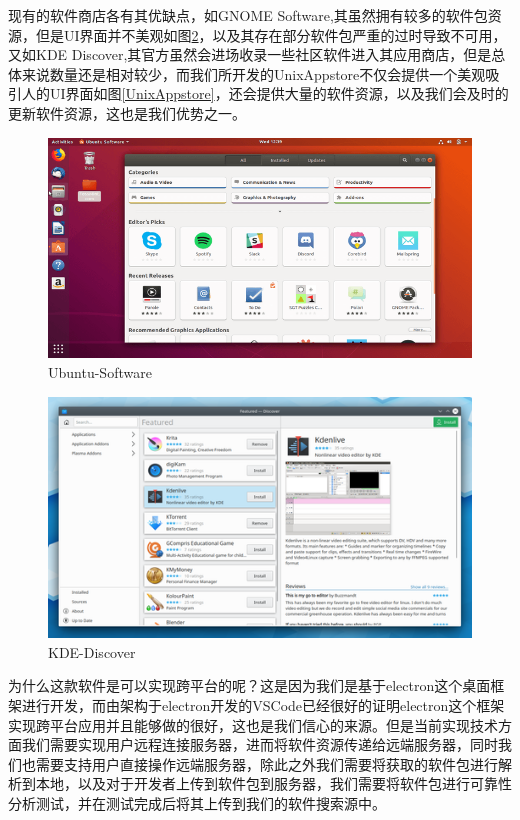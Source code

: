 \documentclass[lang=cn,a4paper]{elegantpaper}
\begin{document}
现有的软件商店各有其优缺点，如GNOME Software,其虽然拥有较多的软件包资源，但是UI界面并不美观如图\ref{KDEDiscover}，以及其存在部分软件包严重的过时导致不可用，又如KDE Discover,其官方虽然会进场收录一些社区软件进入其应用商店，但是总体来说数量还是相对较少，而我们所开发的UnixAppstore不仅会提供一个美观吸引人的UI界面如图\ref{UnixAppstore}，还会提供大量的软件资源，以及我们会及时的更新软件资源，这也是我们优势之一。

\begin{figure}[ht]
    \centering
    \includegraphics[scale=0.5]{./image/UbuntuSoftware}
    \caption{Ubuntu-Software}
	\label{UbuntuSoftware}
\end{figure}

\begin{figure}[ht]
    \centering
    \includegraphics[scale=0.96]{./image/KDEDiscover}
    \caption{KDE-Discover}
	\label{KDEDiscover}
\end{figure}


为什么这款软件是可以实现跨平台的呢？这是因为我们是基于electron这个桌面框架进行开发，而由架构于electron开发的VSCode已经很好的证明electron这个框架实现跨平台应用并且能够做的很好，这也是我们信心的来源。但是当前实现技术方面我们需要实现用户远程连接服务器，进而将软件资源传递给远端服务器，同时我们也需要支持用户直接操作远端服务器，除此之外我们需要将获取的软件包进行解析到本地，以及对于开发者上传到软件包到服务器，我们需要将软件包进行可靠性分析测试，并在测试完成后将其上传到我们的软件搜索源中。
\end{document}
